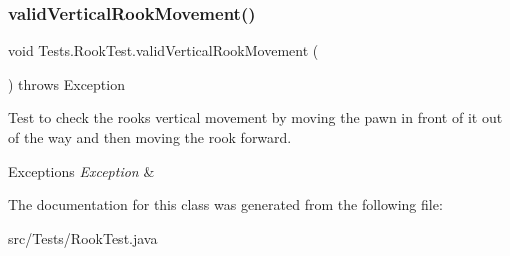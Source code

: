 \subsubsection{\texorpdfstring{valid\+Vertical\+Rook\+Movement()}{validVerticalRookMovement()}}
{\footnotesize\ttfamily void Tests.\+Rook\+Test.\+valid\+Vertical\+Rook\+Movement (\begin{DoxyParamCaption}{ }\end{DoxyParamCaption}) throws Exception}

Test to check the rook\textquotesingle{}s vertical movement by moving the pawn in front of it out of the way and then moving the rook forward. 
\begin{DoxyExceptions}{Exceptions}
{\em Exception} & \\
\hline
\end{DoxyExceptions}


The documentation for this class was generated from the following file\+:\begin{DoxyCompactItemize}
\item 
src/\+Tests/Rook\+Test.\+java\end{DoxyCompactItemize}
